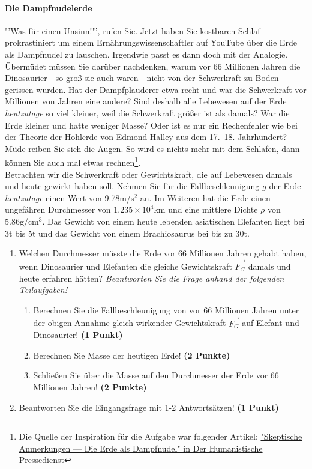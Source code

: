 \documentclass[a4paper, 9pt]{scrartcl}\usepackage[]{graphicx}\usepackage[]{xcolor}
\begin{document}
\paragraph{Die Dampfnudelerde}



"'Was für einen Unsinn!"', rufen Sie. Jetzt haben Sie kostbaren Schlaf prokrastiniert um einem Ernährungswissenschaftler auf YouTube über die Erde als Dampfnudel zu lauschen. Irgendwie passt es dann doch mit der Analogie. Übermüdet müssen Sie darüber nachdenken, warum vor 66 Millionen Jahren die Dinosaurier - so groß sie auch waren - nicht von der Schwerkraft zu Boden gerissen wurden. Hat der Dampfplauderer etwa recht und war die Schwerkraft vor Millionen von Jahren eine andere?  Sind deshalb alle Lebewesen auf der Erde \textit{heutzutage} so viel kleiner, weil die Schwerkraft größer ist als damals? War die Erde kleiner und hatte weniger Masse? Oder ist es nur ein Rechenfehler wie bei der Theorie der Hohlerde von Edmond Halley aus dem 17.–18. Jahrhundert? Müde reiben Sie sich die Augen. So wird es nichts mehr mit dem Schlafen, dann können Sie auch mal etwas rechnen\footnote{Die Quelle der Inspiration
  für die Aufgabe war folgender Artikel:
  \href{https://hpd.de/artikel/erde-dampfnudel-22236}{"Skeptische Anmerkungen --- Die Erde als Dampfnudel" in Der Humanistische Pressedienst}}.  \\

Betrachten wir die Schwerkraft oder Gewichtskraft, die auf Lebewesen damals und heute gewirkt haben soll. Nehmen Sie für die Fallbeschleunigung $g$ der Erde \textit{heutzutage} einen Wert von 9.78m/s$^2$ an. Im Weiteren hat die Erde einen ungefähren Durchmesser von \ensuremath{1.235\times 10^{4}}km und eine mittlere Dichte $\rho$ von 5.86g/cm$^3$. Das Gewicht von einem heute lebenden asiatischen Elefanten liegt bei 3t bis 5t und das Gewicht von einem Brachiosaurus bei bis zu 30t.

\begin{enumerate}
\item Welchen Durchmesser müsste die Erde vor 66 Millionen Jahren gehabt haben, wenn Dinosaurier und Elefanten die gleiche Gewichtskraft $\overrightarrow{F_G}$ damals und heute erfahren hätten? \textit{Beantworten Sie die Frage anhand der folgenden Teilaufgaben!}
\begin{enumerate}
\item Berechnen Sie die Fallbeschleunigung von vor 66 Millionen Jahren unter der obigen Annahme gleich wirkender Gewichtskraft $\overrightarrow{F_G}$ auf Elefant und Dinosaurier! \textbf{(1 Punkt)}
\item Berechnen Sie Masse der heutigen Erde! \textbf{(2 Punkte)}
\item Schließen Sie über die Masse auf den Durchmesser der Erde vor 66 Millionen Jahren! \textbf{(2 Punkte)}
\end{enumerate}
\item Beantworten Sie die Eingangsfrage mit 1-2 Antwortsätzen! \textbf{(1 Punkt)}
\end{enumerate}
\end{document}
